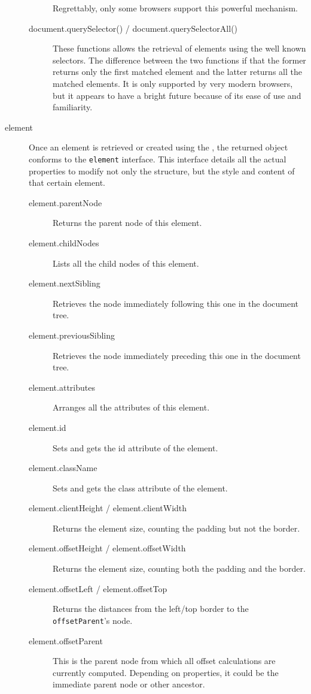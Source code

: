 \begin{description}
\begin{description}
    Regrettably, only some browsers support this powerful mechanism.
    \item[document.querySelector() / document.querySelectorAll()] These functions allows the retrieval of elements using the well known  selectors.
    The difference between the two functions if that the former returns only the first matched element and the latter returns all the matched elements.
    It is only supported by very modern browsers, but it appears to have a bright future because of its ease of use and familiarity.
  \end{description}
  \item[element] Once an element is retrieved or created using the , the returned object conforms to the \texttt{element} interface.
  This interface details all the actual properties to modify not only the  structure, but the style and content of that certain element.
  \begin{description}
    \item[element.parentNode] Returns the parent node of this element.
    \item[element.childNodes] Lists all the child nodes of this element.
    \item[element.nextSibling] Retrieves the node immediately following this one in the document tree.
    \item[element.previousSibling] Retrieves the node immediately preceding this one in the document tree.
    \item[element.attributes] Arranges all the attributes of this element.
    \item[element.id] Sets and gets the id attribute of the element.
    \item[element.className] Sets and gets the class attribute of the element.
    \item[element.clientHeight / element.clientWidth] Returns the element size, counting the padding but not the border.
    \item[element.offsetHeight / element.offsetWidth] Returns the element size, counting both the padding and the border.
    \item[element.offsetLeft / element.offsetTop] Returns the distances from the left/top border to the \texttt{offsetParent}'s node.
    \item[element.offsetParent] This is the parent node from which all offset calculations are currently computed.
    Depending on  properties, it could be the immediate parent node or other ancestor.

\end{description}
\end{description}
